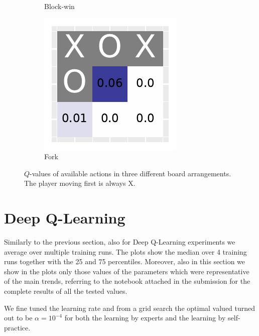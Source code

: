 \documentclass[10pt]{IEEEtran}
\begin{document}
\begin{figure}[h]
\begin{subfigure}[t]{0.32\linewidth}
         \caption{Block-win}
         \label{fig_heatmap_2}
     \end{subfigure}
     \hfill
     \begin{subfigure}[t]{0.32\linewidth}
         \centering
         \includegraphics[width=\linewidth]{code/figures/heatmap_2.pdf}
         \caption{Fork}
         \label{fig_heatmap_3}
     \end{subfigure}
        \caption{$Q$-values of available actions in three different board arrangements. The player moving first is always X.}
        \label{plot_question_10}
\end{figure}

\section{Deep Q-Learning}
Similarly to the previous section, also for Deep Q-Learning experiments we average over multiple training runs. The plots show the median over 4 training runs together with the 25 and 75 percentiles. Moreover, also in this section we show in the plots only those values of the parameters which were representative of the main trends, referring to the notebook attached in the submission for the complete results of all the tested values. 

We fine tuned the learning rate and from a grid search the optimal valued turned out to be $\alpha = 10^{-4}$ for both the learning by experts and the learning by self-practice.
\end{document}
